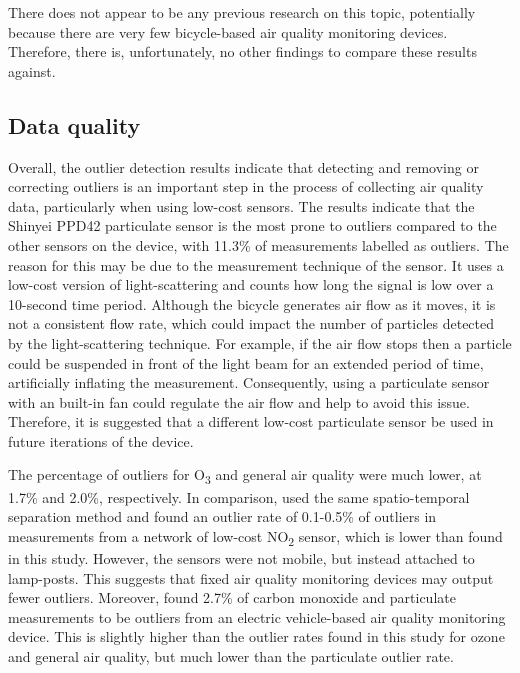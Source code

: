 \documentclass[11pt]{report}
\begin{document}
There does not appear to be any previous research on this topic, potentially because there are very few bicycle-based air quality monitoring devices. Therefore, there is, unfortunately, no other findings to compare these results against.

\subsection{Data quality}

Overall, the outlier detection results indicate that detecting and removing or correcting outliers is an important step in the process of collecting air quality data, particularly when using low-cost sensors. The results indicate that the Shinyei PPD42 particulate sensor is the most prone to outliers compared to the other sensors on the device, with 11.3\% of measurements labelled as outliers. The reason for this may be due to the measurement technique of the sensor. It uses a low-cost version of light-scattering and counts how long the signal is low over a 10-second time period. Although the bicycle generates air flow as it moves, it is not a consistent flow rate, which could impact the number of particles detected by the light-scattering technique. For example, if the air flow stops then a particle could be suspended in front of the light beam for an extended period of time, artificially inflating the measurement. Consequently, using a particulate sensor with an built-in fan could regulate the air flow and help to avoid this issue. Therefore, it is suggested that a different low-cost particulate sensor be used in future iterations of the device.

The percentage of outliers for O\textsubscript{3} and general air quality were much lower, at 1.7\% and 2.0\%, respectively. In comparison, \cite{vanZoest2018outlierdetection} used the same spatio-temporal separation method and found an outlier rate of 0.1-0.5\% of outliers in measurements from a network of low-cost NO\textsubscript{2} sensor, which is lower than found in this study. However, the sensors were not mobile, but instead attached to lamp-posts. This suggests that fixed air quality monitoring devices may output fewer outliers. Moreover, \cite{Hagler2010durhamallelectric} found 2.7\% of carbon monoxide and particulate measurements to be outliers from an electric vehicle-based air quality monitoring device. This is slightly higher than the outlier rates found in this study for ozone and general air quality, but much lower than the particulate outlier rate.
\end{document}
